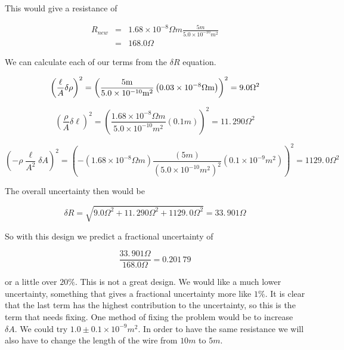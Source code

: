 \noindent This would give a resistance of 

\begin{eqnarray*}
	R_{new} &=&1.68\times 10^{-8}\unit{\Omega}\unit{m}\frac{5\unit{m}}{5.0\times 10^{-10}\unit{m}^{2}} \\
	&=&168.0\unit{\Omega}
\end{eqnarray*}

We can calculate each of our terms from the $\delta R$ equation. 

\begin{equation*}
	\left( \frac{\ell }{A}\delta \rho \right) ^{2}=\left( \frac{5\unit{m}}{%
		5.0\times 10^{-10}\unit{m}^{2}}\left( 0.03\times 10^{-8}\unit{\Omega	}\unit{m}\right) \right) ^{2}=9.0\unit{\Omega}^{2}
\end{equation*}

\begin{equation*}
	\left( \frac{\rho }{A}\delta \ell \right) ^{2}=\left( \frac{1.68\times
		10^{-8}\unit{\Omega}\unit{m}}{5.0\times 10^{-10}\unit{m}^{2}}\left( 0.1\unit{m}\right) \right) 	^{2}=11.\,\allowbreak 290\unit{\Omega}^{2}
\end{equation*}

\begin{equation*}
	\left( -\rho \frac{\ell }{A^{2}}\delta A\right) ^{2}=\left( -\left(
	1.68\times 10^{-8}\unit{\Omega}\unit{m}\right) \frac{\left( 5\unit{m}\right) }{\left( 5.0\times 10^{-10} \unit{m}^{2}\right) ^{2}}\left( 0.1\times 10^{-9}\unit{m}^{2}\right) \right)
	^{2}=1129.\,\allowbreak 0\unit{\Omega}^{2}
\end{equation*}

\noindent The overall uncertainty then would be

\begin{equation*}
	\delta R=\sqrt{9.0\unit{\Omega}^{2}+11.\,\allowbreak 290\unit{\Omega}^{2}+1129.\,\allowbreak 0\unit{\Omega}^{2}}=33.\,\allowbreak 901\unit{\Omega}
\end{equation*}

So with this design we predict a fractional uncertainty of 

\begin{equation*}
	\frac{33.\,\allowbreak 901\unit{\Omega}}{168.0\unit{\Omega}}=0.201\,79
\end{equation*}

or a little over $20\%.$ This is not a great design. We would like a much lower uncertainty, something that gives a fractional uncertainty more like $1\%.$ It is clear that the last term has the highest contribution to the uncertainty, so this is the term that needs fixing. One method of fixing the problem would be to increase $\delta A.$ We could try $1.0\pm 0.1\times
10^{-9}\unit{m}^{2}.$ In order to have the same resistance we will also have to change the length of the wire from $10\unit{m}$ to $5\unit{m}$. 

